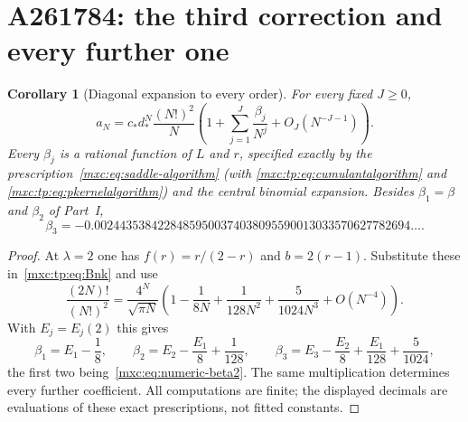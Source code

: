 \documentclass[11pt]{article}
\numberwithin{equation}{section}
\newtheorem{corollary}[theorem]{Corollary}
\theoremstyle{definition}
\theoremstyle{remark}
\begin{document}
\section{A261784: the third correction and every further one}\label{mxc:tp:sec:diagonal}

\begin{corollary}[Diagonal expansion to every order]\label{mxc:tp:cor:diagonal}
For every fixed $J\ge0$,
\begin{equation}\label{mxc:tp:eq:diagonalall}
 a_N=c_*d_*^N\frac{(N!)^2}{N}
 \left(1+\sum_{j=1}^{J}\frac{\beta_j}{N^j}+O_J(N^{-J-1})\right).
\end{equation}
Every $\beta_j$ is a rational function of $L$ and $r$, specified exactly
by the prescription~\eqref{mxc:eq:saddle-algorithm} (with
\eqref{mxc:tp:eq:cumulantalgorithm} and \eqref{mxc:tp:eq:pkernelalgorithm})
and the central binomial expansion. Besides $\beta_1=\beta$ and
$\beta_2$ of Part~I,
\begin{equation}\label{mxc:tp:eq:beta3}
 \beta_3=-0.00244353842284859500374038095590013033570627782694\ldots.
\end{equation}
\end{corollary}
\begin{proof}
At $\lambda=2$ one has $f(r)=r/(2-r)$ and $b=2(r-1)$. Substitute these
in~\eqref{mxc:tp:eq:Bnk} and use
\begin{equation}\label{mxc:tp:eq:centralbinom}
 \frac{(2N)!}{(N!)^2}=\frac{4^N}{\sqrt{\pi N}}
 \left(1-\frac1{8N}+\frac1{128N^2}+\frac5{1024N^3}+O(N^{-4})\right).
\end{equation}
With $E_j=E_j(2)$ this gives
\begin{equation}\label{mxc:tp:eq:deltarecipe}
 \beta_1=E_1-\frac18,\qquad
 \beta_2=E_2-\frac{E_1}8+\frac1{128},\qquad
 \beta_3=E_3-\frac{E_2}8+\frac{E_1}{128}+\frac5{1024},
\end{equation}
the first two being~\eqref{mxc:eq:numeric-beta2}. The same multiplication
determines every further coefficient. All computations are finite; the
displayed decimals are evaluations of these exact prescriptions, not
fitted constants.
\end{proof}
\end{document}
